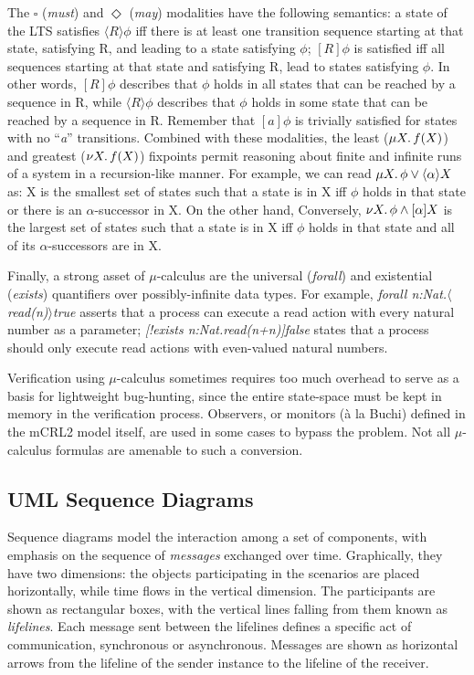 \documentclass[letter]{llncs}
\begin{document}
The $\square$ (\emph{must}) and $\Diamond$ (\emph{may}) modalities  have the following semantics:
a state of the LTS satisfies $\langle R \rangle\phi$ iff there is at least one transition sequence 
starting at that state, satisfying R, and leading to a state satisfying $\phi$;
$[R]\phi$ is satisfied iff all sequences starting at that state and satisfying R, 
lead to states satisfying  $\phi$.
In other words, $[R]\phi$ describes that $\phi$ holds in all states that can be reached by a sequence in R,
while $\langle R \rangle\phi$ describes that $\phi$ holds in some state that can be reached by a sequence in R.
Remember that $[a]\phi$ is trivially satisfied for states with no “\emph{a}” transitions.
Combined with these modalities, the least ($\mu X\ldotp f(X)$) and greatest
($\nu X\ldotp f(X)$) fixpoints permit reasoning about finite and infinite runs
of a system in a recursion-like manner.
For example, we can read $\mu X\ldotp\phi\vee\langle\alpha\rangle X$ as: X is
the smallest set of states such that a state is in X
iff $\phi$ holds in that state or there is an $\alpha$-successor in X. 
On the other hand, 
Conversely, $\nu X\ldotp\phi \wedge[\alpha]X$ is the largest set of states such that a state is in X iff
$\phi$ holds in that state and all of its $\alpha$-successors are in X.

Finally, a strong asset of $\mu$-calculus are the universal (\emph{forall}) and existential (\emph{exists}) quantifiers over possibly-infinite data types.
For example, \emph{forall n:Nat.$\langle$read(n)$\rangle$true} asserts that a process can execute a read action with every natural number as a parameter;
\emph{[!exists n:Nat.read(n+n)]false} states that a process should only execute read actions with even-valued natural numbers.

Verification using $\mu$-calculus sometimes requires too much overhead to serve as a basis for lightweight 
bug-hunting, since the entire state-space must be kept in memory in the verification process.
Observers, or monitors (\`{a} la Buchi) defined in the mCRL2 model itself, are used in some cases to bypass the problem.
Not all $\mu$-calculus formulas are amenable to such a conversion.

\subsection{UML Sequence Diagrams}

Sequence diagrams model the interaction among a set of components, with
emphasis on the sequence of \emph{messages} exchanged over time. Graphically, they have
two dimensions: the objects participating in the scenarios are placed horizontally, 
while time flows in the vertical dimension. The participants are shown as rectangular boxes, with the vertical lines
falling from them known as \emph{lifelines}. 
Each message sent between the lifelines defines a specific act of communication, synchronous or asynchronous.
Messages are shown as horizontal arrows from the lifeline of the sender instance to the lifeline of the receiver. 
\end{document}
